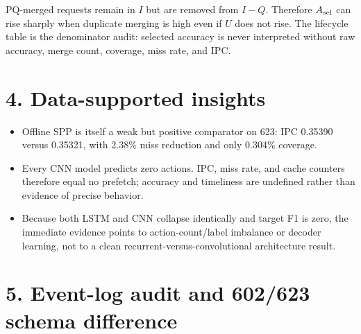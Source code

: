 \documentclass[10pt]{article}
\begin{document}
\begin{infobox}[title={\bfseries Why raw and selected accuracy can disagree}]
PQ-merged requests remain in $I$ but are removed from $I-Q$.  Therefore
$A_{\rm sel}$ can rise sharply when duplicate merging is high even if $U$ does
not rise.  The lifecycle table is the denominator audit: selected accuracy is
never interpreted without raw accuracy, merge count, coverage, miss rate, and
IPC.
\end{infobox}

\section*{4. Data-supported insights}
\begin{infobox}[fontupper=\small]
\begin{itemize}[itemsep=1pt,topsep=1pt]
\item Offline SPP is itself a weak but positive comparator on 623: IPC 0.35390 versus 0.35321, with 2.38\% miss reduction and only 0.304\% coverage.
\item Every CNN model predicts zero actions.  IPC, miss rate, and cache counters therefore equal no prefetch; accuracy and timeliness are undefined rather than evidence of precise behavior.
\item Because both LSTM and CNN collapse identically and target F1 is zero, the immediate evidence points to action-count/label imbalance or decoder learning, not to a clean recurrent-versus-convolutional architecture result.
\end{itemize}
\end{infobox}

\section*{5. Event-log audit and 602/623 schema difference}
\begin{center}\scriptsize
{}
\end{center}
\end{document}
